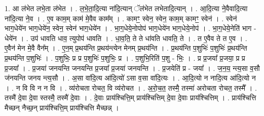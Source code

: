 \documentclass[17pt]{extarticle}
\begin{document}
1. आ ल॑भेत लभे॒ता ल॑भेत । . ल॒भे॒ता॒दि॒त्या ना॑दि॒त्यान् ॅल॑भेत लभेतादि॒त्यान् । . आ॒दि॒त्या ने॒वैवादि॒त्या ना॑दि॒त्या ने॒व । . ए॒व काम॒म् काम॑ मे॒वैव काम᳚म् । . कामꣳ॒॒ स्वेन॒ स्वेन॒ काम॒म् कामꣳ॒॒ स्वेन॑ । . स्वेन॑ भाग॒धेये॑न भाग॒धेये॑न॒ स्वेन॒ स्वेन॑ भाग॒धेये॑न । . भा॒ग॒धेये॒नोपोप॑ भाग॒धेये॑न भाग॒धेये॒नोप॑ । . भा॒ग॒धेये॒नेति॑ भाग - धेये॑न । . उप॑ धावति धाव॒ त्युपोप॑ धावति । . धा॒व॒ति॒ ते ते धा॑वति धावति॒ ते । . त ए॒वैव ते त ए॒व । . ए॒वैन॑ मेन मे॒वै वैन᳚म् । . ए॒न॒म् प्र॒थय॑न्ति प्र॒थय॑न्त्येन मेनम् प्र॒थय॑न्ति । . प्र॒थय॑न्ति प॒शुभिः॑ प॒शुभिः॑ प्र॒थय॑न्ति प्र॒थय॑न्ति प॒शुभिः॑ । . प॒शुभिः॒ प्र प्र प॒शुभिः॑ प॒शुभिः॒ प्र । . प॒शुभि॒रिति॑ प॒शु - भिः॒ । . प्र प्र॒जया᳚ प्र॒जया॒ प्र प्र प्र॒जया᳚ । . प्र॒जया॑ जनयन्ति जनयन्ति प्र॒जया᳚ प्र॒जया॑ जनयन्ति । . प्र॒जयेति॑ प्र - जया᳚ । . ज॒न॒य॒ न्त्य॒सा व॒सौ ज॑नयन्ति जनय न्त्य॒सौ । . अ॒सा वा॑दि॒त्य आ॑दि॒त्यो॑ ऽसा व॒सा वा॑दि॒त्यः । . आ॒दि॒त्यो न नादि॒त्य आ॑दि॒त्यो न । . न वि वि न न वि । . व्य॑रोचता रोचत॒ वि व्य॑रोचत । . अ॒रो॒च॒त॒ तस्मै॒ तस्मा॑ अरोचता रोचत॒ तस्मै᳚ । . तस्मै॑ दे॒वा दे॒वा स्तस्मै॒ तस्मै॑ दे॒वाः । . दे॒वाः प्राय॑श्चित्ति॒म् प्राय॑श्चित्तिम् दे॒वा दे॒वाः प्राय॑श्चित्तिम् । . प्राय॑श्चित्ति मैच्छन् नैच्छ॒न् प्राय॑श्चित्ति॒म् प्राय॑श्चित्ति मैच्छन्न् । \newline
\end{document}
